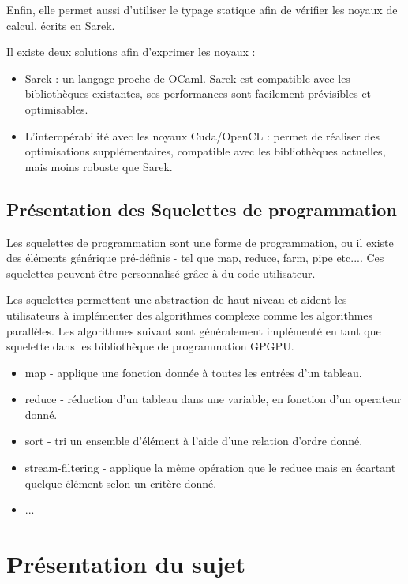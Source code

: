 \documentclass{report}
\begin{document}
Enfin, elle permet aussi d’utiliser le typage statique afin de vérifier les noyaux de calcul, écrits en Sarek.

Il existe deux solutions afin d’exprimer les noyaux :
\begin{itemize}

\item Sarek : un langage proche de OCaml. Sarek est compatible avec les bibliothèques existantes, ses performances sont facilement prévisibles et optimisables.

\item L’interopérabilité avec les noyaux Cuda/OpenCL : permet de réaliser des optimisations supplémentaires, compatible avec les bibliothèques actuelles, mais moins robuste que Sarek.


\end{itemize}

\section{Présentation des Squelettes de programmation}
Les squelettes de programmation sont une forme de programmation, ou il existe des éléments générique pré-définis - tel que map, reduce, farm, pipe etc.... Ces squelettes peuvent être personnalisé grâce à du code utilisateur. 

Les squelettes permettent une abstraction de haut niveau et aident les utilisateurs à implémenter des algorithmes complexe comme les algorithmes parallèles. Les algorithmes suivant sont généralement implémenté en tant que squelette dans les bibliothèque de programmation GPGPU.

\begin{itemize}
\item map - applique une fonction donnée à toutes les entrées d’un tableau.
\item reduce - réduction d’un tableau dans une variable, en fonction d’un operateur donné.
\item sort - tri un ensemble d’élément à l’aide d’une relation d’ordre donné.
\item stream-filtering - applique la même opération que le reduce mais en écartant quelque élément selon un critère donné.
\item ...
\end{itemize}

\chapter{Présentation du sujet}
\end{document}
